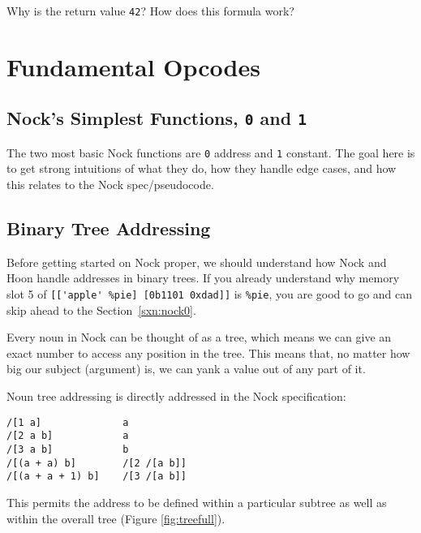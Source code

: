 \documentclass[twoside]{article}
\begin{document}
Why is the return value \lstinline[style=inlinecode]{42}? How does this formula work?

\section{Fundamental Opcodes}

\subsection{Nock's Simplest Functions, \lstinline[style=inlinecode]{0} and \lstinline[style=inlinecode]{1}}

The two most basic Nock functions are \lstinline[style=inlinecode]{0} address and \lstinline[style=inlinecode]{1} constant. The goal here is to get strong intuitions of what they do, how they handle edge cases, and how this relates to the Nock spec/pseudocode.

\subsection{Binary Tree Addressing}

Before getting started on Nock proper, we should understand how Nock and Hoon handle addresses in binary trees.  If you already understand why memory slot 5 of \lstinline[style=inlinecode]{[['apple' %pie] [0b1101 0xdad]]} is \lstinline[style=inlinecode]{%pie}, you are good to go and can skip ahead to the Section~\ref{sxn:nock0}.

Every noun in Nock can be thought of as a tree, which means we can give an exact number to access any position in the tree. This means that, no matter how big our subject (argument) is, we can yank a value out of any part of it.

Noun tree addressing is directly addressed in the Nock specification:

\begin{lstlisting}[style=listingcode]
/[1 a]              a
/[2 a b]            a
/[3 a b]            b
/[(a + a) b]        /[2 /[a b]]
/[(a + a + 1) b]    /[3 /[a b]]
\end{lstlisting}

\noindent{}
This permits the address to be defined within a particular subtree as well as within the overall tree (Figure \ref{fig:treefull}).
\end{document}
